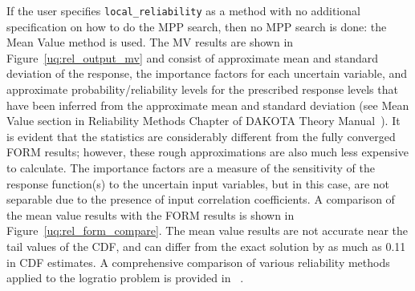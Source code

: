 If the user specifies \texttt{local\_reliability} as a method with no
additional specification on how to do the MPP search, then no MPP
search is done: the Mean Value method is used.  The MV results are
shown in Figure~\ref{uq:rel_output_mv} and consist of approximate mean
and standard deviation of the response, the importance factors for
each uncertain variable, and approximate probability/reliability
levels for the prescribed response levels that have been inferred from
the approximate mean and standard deviation (see Mean Value section in
Reliability Methods Chapter of DAKOTA Theory
Manual~\cite{TheoMan}). It is evident that the statistics are
considerably different from the fully converged FORM results; however,
these rough approximations are also much less expensive to
calculate. The importance factors are a measure of the sensitivity of
the response function(s) to the uncertain input variables, but in this
case, are not separable due to the presence of input correlation
coefficients. A comparison of the mean value results with the FORM
results is shown in Figure~\ref{uq:rel_form_compare}.  The mean value
results are not accurate near the tail values of the CDF, and can
differ from the exact solution by as much as 0.11 in CDF estimates.  A
comprehensive comparison of various reliability methods applied to the
logratio problem is provided in ~\cite{Eld06a}.


